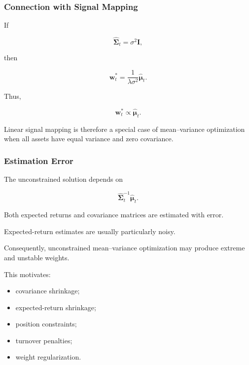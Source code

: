 \documentclass[11pt,a4paper]{article}
\begin{document}
\subsubsection{Connection with Signal Mapping}

If

\begin{equation}
\widehat{\boldsymbol{\Sigma}}_t
=
\sigma^2
\mathbf{I},
\end{equation}

then

\begin{equation}
\mathbf{w}_t^{*}
=
\frac{1}{\lambda\sigma^2}
\widehat{\boldsymbol{\mu}}_t.
\end{equation}

Thus,

\begin{equation}
\boxed{
\mathbf{w}_t^{*}
\propto
\widehat{\boldsymbol{\mu}}_t.
}
\end{equation}

Linear signal mapping is therefore a special case of mean--variance
optimization when all assets have equal variance and zero covariance.


\subsubsection{Estimation Error}

The unconstrained solution depends on

\begin{equation}
\widehat{\boldsymbol{\Sigma}}_t^{-1}
\widehat{\boldsymbol{\mu}}_t.
\end{equation}

Both expected returns and covariance matrices are estimated with error.

Expected-return estimates are usually particularly noisy.

Consequently, unconstrained mean--variance optimization may produce extreme
and unstable weights.

This motivates:

\begin{itemize}
    \item covariance shrinkage;
    \item expected-return shrinkage;
    \item position constraints;
    \item turnover penalties;
    \item weight regularization.
\end{itemize}
\end{document}
